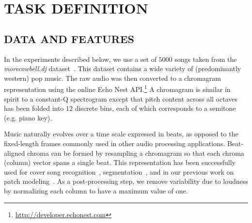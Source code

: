 \documentclass{article}
\begin{document}
\section{TASK DEFINITION}
\label{sec:task}

\subsection{DATA AND FEATURES}
\label{ssec:feats}
In the experiments described below, we use a set of $5000$ songs taken
from the \emph{morecowbell.dj} dataset~\cite{Bertin-Mahieux2010a}.
This dataset contains a wide variety of (predominantly western) pop
music.  The raw audio was then converted to a chromagram
representation using the online Echo Nest
API.\footnote{\url{http://developer.echonest.com}} A chromagram is
similar in spirit to a constant-Q spectrogram except that pitch
content across all octaves has been folded into $12$ discrete bins,
each of which corresponds to a semitone (e.g. piano key).
%

Music naturally evolves over a time scale expressed in beats, as
opposed to the fixed-length frames commonly used in other audio
processing applications.  Beat-aligned chroma can be formed by
resampling a chromagram so that each chroma (column) vector spans a
single beat.  This representation has been successfully used for cover
song recognition~\cite{Ellis2007a}, segmentation~\cite{Weiss2010}, and
in our previous work on patch modeling~\cite{Bertin-Mahieux2010a}.  As
a post-processing step, we remove variability due to loudness by
normalizing each column to have a maximum value of one.


\end{document}
